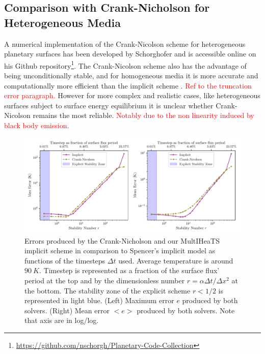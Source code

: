 \documentclass[]{interact}
\theoremstyle{plain}%
\theoremstyle{definition}
\theoremstyle{remark}
\begin{document}
\subsection{Comparison with Crank-Nicholson for Heterogeneous Media}

A numerical implementation of the Crank-Nicolson scheme for heterogeneous planetary surfaces has been developed by Schorghofer \cite{Schorghofer2010} and is accessible online on his Github repository\footnote{\url{https://github.com/nschorgh/Planetary-Code-Collection}}. 
The Crank-Nicolson scheme also has the advantage of being unconditionally stable, and for homogeneous media it is more accurate \cite{citer} and computationally more efficient than the implicit scheme \cite{citer}.  \textcolor{red}{Ref to the truncation error paragraph.}
However for more complex and realistic cases, like heterogeneous surfaces subject to surface energy equilibrium  it is unclear whether Crank-Nicolson remains the most reliable. \textcolor{red}{Notably due to the non linearity induced by black body emission.}

\begin{figure}[htpb]
	\centering
	\includegraphics[width=1.0\textwidth]{figures/solver_compare.pdf}
	\caption{Errors produced by the Crank-Nicholson and our MultIHeaTS implicit scheme in comparison to Spencer's implicit model as functions of the timesteps $\Delta t$ used. Average temperature is around $\SI{90}{K}$. Timestep is represented as a fraction of the surface flux' period at the top and by the dimensionless number $r=\alpha \Delta t / \Delta x^2$ at the bottom. The stability zone of the explicit scheme $r< 1/2$ is represented in light blue. (Left) Maximum error $e$ produced by both solvers. (Right) Mean error $<e>$ produced by both solvers. Note that axis are in log/log.
 }
	\label{fig:solvers_comp}
\end{figure}
\end{document}
